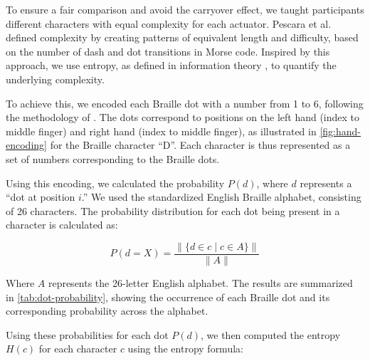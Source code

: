 To ensure a fair comparison and avoid the carryover effect, we taught participants different characters with equal complexity for each actuator. Pescara et al. \cite{Pescara2019} defined complexity by creating patterns of equivalent length and difficulty, based on the number of dash and dot transitions in Morse code. Inspired by this approach, we use entropy, as defined in information theory \cite{Gray2011, Shannon1948, Shannon2001}, to quantify the underlying complexity.

To achieve this, we encoded each Braille dot with a number from 1 to 6, following the methodology of \cite{Yang2017}. The dots correspond to positions on the left hand (index to middle finger) and right hand (index to middle finger), as illustrated in \autoref{fig:hand-encoding} for the Braille character \enquote{D}. Each character is thus represented as a set of numbers corresponding to the Braille dots.

Using this encoding, we calculated the probability \( P(d) \), where \( d \) represents a ``dot at position \( i \).'' We used the standardized English Braille alphabet, consisting of 26 characters. The probability distribution for each dot being present in a character is calculated as:

\[
P(d = X) = \frac{\|\{d \in c \mid c \in A\}\|}{\|A\|}
\]

Where \( A \) represents the 26-letter English alphabet.
The results are summarized in \autoref{tab:dot-probability}, showing the occurrence of each Braille dot and its corresponding probability across the alphabet.


\begin{table}[!ht]
\centering
{}
    \caption{Probability for each dot occurring.}
    \label{tab:dot-probability}
\end{table}

Using these probabilities for each dot \( P(d) \), we then computed the entropy \( H(c) \) for each character \( c \) using the entropy formula:

